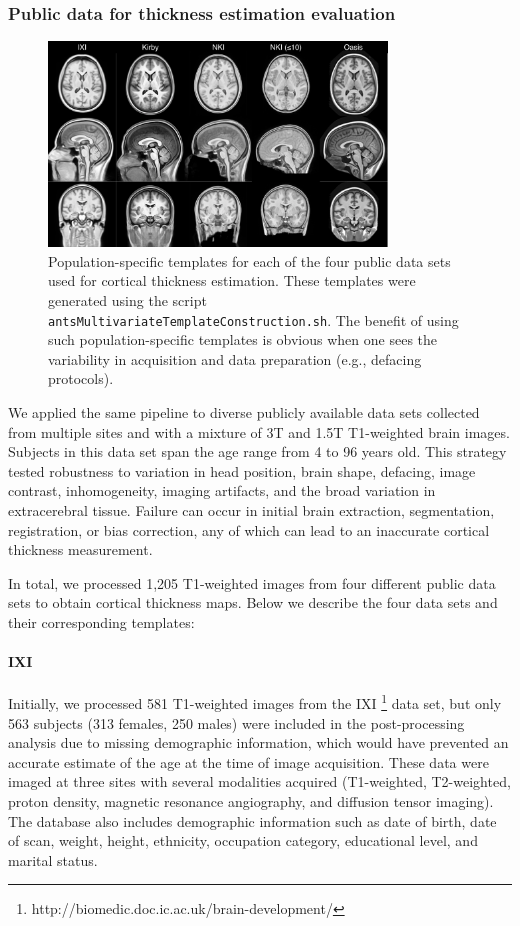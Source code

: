 \subsubsection{Public data for thickness estimation evaluation}

\begin{figure}
  \centering
  \includegraphics[width=90mm]{Figures/templates.pdf}
  \caption{Population-specific templates for each of the four public data sets used
  for cortical thickness 
  estimation. These templates were generated using the script {\tt antsMultivariateTemplateConstruction.sh}.
  The benefit of using such population-specific templates is obvious when one sees the variability in
  acquisition and data preparation (e.g., defacing protocols).
  }
  \label{fig:template}
\end{figure}

We applied the same pipeline to diverse publicly available data sets collected
from multiple sites and with a mixture of 3T and
1.5T T1-weighted brain images.  Subjects in this data set  
span the age range from 4 to 96 years old.  This strategy tested robustness to
variation in head position, brain shape, defacing, image contrast, inhomogeneity, imaging
artifacts, and the broad variation in extracerebral tissue.  Failure
can occur in initial brain extraction, segmentation, registration, or
bias correction, any of which can lead to an inaccurate cortical
thickness measurement.                           

In total, we processed 1,205 T1-weighted images from four different
public data sets to obtain cortical thickness maps.
Below we describe the four data sets and their corresponding
templates:
                                          
\paragraph{IXI}
Initially, we processed 581 T1-weighted images from the IXI%
\footnote{
http://biomedic.doc.ic.ac.uk/brain-development/
}
 data set, but only 563 subjects
(313 females, 250 males) were included in the post-processing analysis due to 
missing demographic information, which would have prevented an accurate estimate of
the age at the time of image acquisition.  These data were
imaged at three sites 
with several modalities acquired (T1-weighted, T2-weighted, proton density, magnetic 
resonance angiography, and diffusion tensor imaging).  The 
database also includes demographic information such as date of birth, date
of scan, weight,
height, ethnicity, occupation category, educational level, and marital status.

